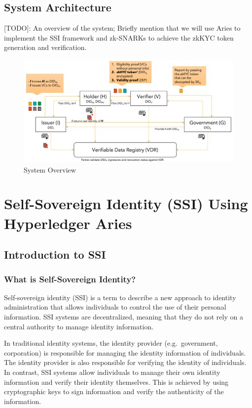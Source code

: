 \documentclass[
]{report}
\begin{document}
\section{System Architecture}

{[}TODO{]}: An overview of the system; Briefly mention that we
will use Aries to implement the SSI framework and zk-SNARKs to achieve
the zkKYC token generation and verification.

\begin{figure}
\centering
\includegraphics{zkkyc-system.png}
\caption{System Overview}
\end{figure}

\chapter{Self-Sovereign Identity (SSI) Using Hyperledger Aries}

\section{Introduction to SSI}
\subsection{What is Self-Sovereign Identity?}
Self-sovereign identity (SSI) is a term to describe a new approach to
identity administration that allows individuals to control the use of
their personal information. SSI systems are decentralized, meaning that
they do not rely on a central authority to manage identity information.

In traditional identity systems, the identity provider (e.g.~government,
corporation) is responsible for managing the identity information of
individuals. The identity provider is also responsible for verifying
the identity of individuals. In contrast, SSI systems allow individuals
to manage their own identity information and verify their identity
themselves. This is achieved by using cryptographic keys to sign
information and verify the authenticity of the information.
\end{document}
